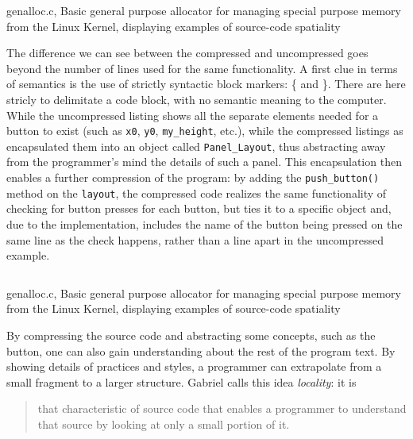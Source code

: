 \begin{listing}
    \inputminted[]{c}{./corpus/uncompressed.c}
    \caption{genalloc.c, Basic general purpose allocator for managing special purpose memory from the Linux Kernel, displaying examples of source-code spatiality \citep{muratori_semantic_2014}}
    \label{code:uncompressed}
\end{listing}

The difference we can see between the compressed and uncompressed goes beyond the number of lines used for the same functionality. A first clue in terms of semantics is the use of strictly syntactic block markers: \{ and \}. There are here stricly to delimitate a code block, with no semantic meaning to the computer. While the uncompressed listing shows all the separate elements needed for a button to exist (such as \lstinline{x0}, \lstinline{y0}, \lstinline{my_height}, etc.), while the compressed listings as encapsulated them into an object called \lstinline{Panel_Layout}, thus abstracting away from the programmer's mind the details of such a panel. This encapsulation then enables a further compression of the program: by adding the \lstinline{push_button()} method on the \lstinline{layout}, the compressed code realizes the same functionality of checking for button presses for each button, but ties it to a specific object and, due to the implementation, includes the name of the button being pressed on the same line as the check happens, rather than a line apart in the uncompressed example.

\begin{listing}
    \inputminted[]{c}{./corpus/compressed.c}
    \caption{genalloc.c, Basic general purpose allocator for managing special purpose memory from the Linux Kernel, displaying examples of source-code spatiality \citep{muratori_semantic_2014}}
    \label{code:compressed}
\end{listing}

By compressing the source code and abstracting some concepts, such as the button, one can also gain understanding about the rest of the program text. By showing details of practices and styles, a programmer can extrapolate from a small fragment to a larger structure. Gabriel calls this idea \emph{locality}: it is

\begin{quote}
    that characteristic of source code that enables a programmer to understand that source by looking at only a small portion of it. \citep{gabriel_patterns_1998}
\end{quote}

